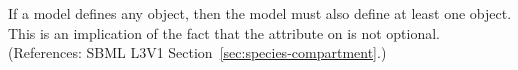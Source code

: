 If a model defines any \Species object, then the model must also define at
least one \Compartment object.  This is an implication of the fact that the
 attribute on \Species is not optional.  (References:
SBML L3V1 Section~\ref{sec:species-compartment}.)
